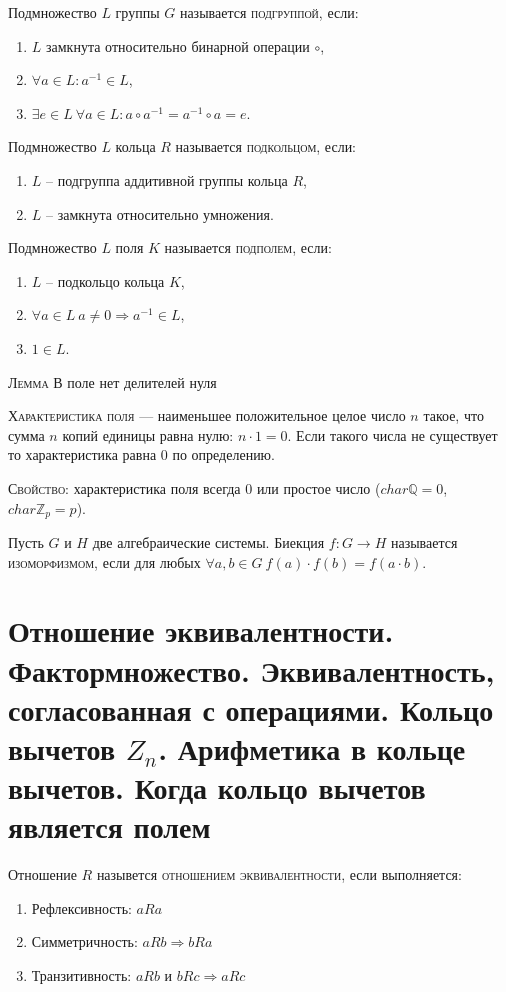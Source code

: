 \documentclass{article}
\begin{document}
Подмножество $L$ группы $G$ называется \textsc{подгруппой}, если:
\begin{enumerate}
    \item $L$ замкнута относительно бинарной операции $\circ$,
    \item $\forall a\in L\colon a^{-1}\in L$,
    \item $\exists e\in L\ \forall a\in L\colon a\circ a^{-1}=a^{-1}\circ a=e$.
\end{enumerate}

Подмножество $L$ кольца $R$ называется \textsc{подкольцом}, если:
\begin{enumerate}
    \item $L$ – подгруппа аддитивной группы кольца $R$,
    \item $L$ – замкнута относительно умножения.
\end{enumerate}

Подмножество $L$ поля $K$ называется \textsc{подполем}, если:
\begin{enumerate}
    \item $L$ – подкольцо кольца $K$,
    \item $\forall a\in L\ a\neq 0\Rightarrow a^{-1}\in L$,
    \item $1\in L$.
\end{enumerate}

\textsc{Лемма} В поле нет делителей нуля

\textsc{Характеристика поля} — наименьшее положительное целое число $n$ такое, что сумма $n$ копий единицы равна нулю:
$n\cdot 1=0$.
Если такого числа не существует то характеристика равна 0 по определению. 

\textsc{Свойство:} характеристика поля всегда 0 или простое число ($char \mathbb{Q}=0$, $char \mathbb{Z}_p=p$).

Пусть ${\displaystyle G\!}$ и ${\displaystyle H\!}$ две алгебраические системы. Биекция ${\displaystyle f:G\to H}$ называется \textsc{изоморфизмом}, если для любых ${\forall a,b\in G} \ {\displaystyle f(a)\cdot f(b)=f(a\cdot b).}$

\section{Отношение эквивалентности. Фактормножество. Эквивалентность, согласованная с операциями. Кольцо вычетов $Z_n$. Арифметика в кольце вычетов. Когда кольцо вычетов является полем}
Отношение $R$ назывется \textsc{отношением эквивалентности}, если выполняется:
\begin{enumerate}
    \item Рефлексивность: $aRa$
    \item Симметричность: $aRb\Rightarrow bRa$
    \item Транзитивность: $aRb$ и $bRc\Rightarrow aRc$
\end{enumerate}
\end{document}

